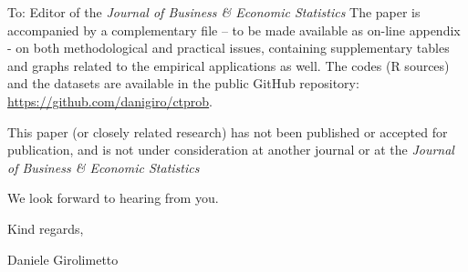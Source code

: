 \documentclass[11pt,a4paper]{letter}
\begin{document}
\begin{letter}{To: Editor of the \textit{Journal of Business \& Economic Statistics}}
The paper is accompanied by a complementary file – to be made available as on-line appendix - on both methodological and practical issues, containing supplementary tables and graphs related to the empirical applications as well. The codes (R sources) and the datasets are available in the public GitHub repository: \url{https://github.com/danigiro/ctprob}.

This paper (or closely related research) has not been published or accepted for publication, and is not under consideration at another journal or at the \textit{Journal of Business \& Economic Statistics}

We look forward to hearing from you.

Kind regards,

Daniele Girolimetto

 \end{letter}
\end{document}
